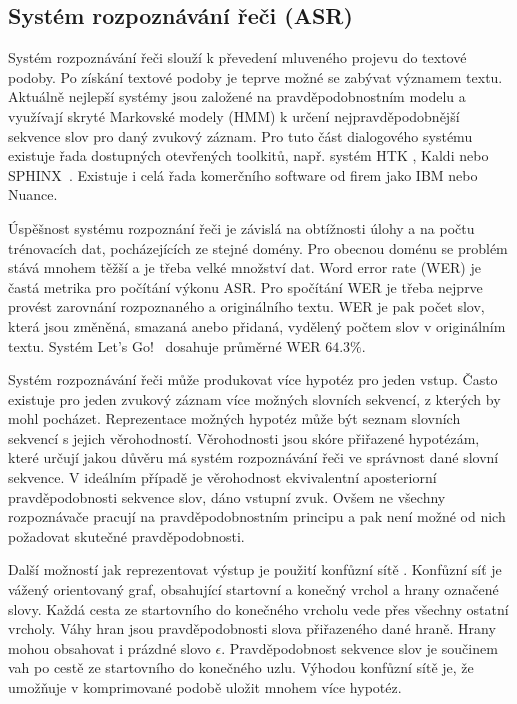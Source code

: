 \subsection{Systém rozpoznávání řeči (ASR)}

Systém rozpoznávání řeči slouží k převedení mluveného projevu do textové podoby. 
Po získání textové podoby je teprve možné se zabývat významem textu.
Aktuálně nejlepší systémy jsou založené na pravděpodobnostním modelu a využívají skryté Markovské modely (HMM) k určení nejpravděpodobnější sekvence slov pro daný zvukový záznam.
Pro tuto část dialogového systému existuje řada dostupných otevřených toolkitů, např. systém HTK \cite{young2002htk}, Kaldi \cite{Povey_ASRU2011} nebo SPHINX~\cite{walker2004sphinx}.
Existuje i celá řada komerčního software od firem jako IBM nebo Nuance.

Úspěšnost systému rozpoznání řeči je závislá na obtížnosti úlohy a na počtu trénovacích dat, pocházejících ze stejné domény.
Pro obecnou doménu se problém stává mnohem těžší a je třeba velké množství dat. 
Word error rate (WER) je častá metrika pro počítání výkonu ASR.
Pro spočítání WER je třeba nejprve provést zarovnání rozpoznaného a originálního textu. WER je pak počet slov, která jsou změněná, smazaná anebo přidaná, vydělený počtem slov v originálním textu.
Systém Let's Go!~\cite{raux2006doing} dosahuje průměrné WER $64.3\%$.

Systém rozpoznávání řeči může produkovat více hypotéz pro jeden vstup.
Často existuje pro jeden zvukový záznam více možných slovních sekvencí, z kterých by mohl pocházet.
Reprezentace možných hypotéz může být seznam slovních sekvencí s jejich věrohodností.
Věrohodnosti jsou skóre přiřazené hypotézám, které určují jakou důvěru má systém rozpoznávání řeči ve správnost dané slovní sekvence.
V ideálním případě je věrohodnost ekvivalentní aposteriorní pravděpodobnosti sekvence slov, dáno vstupní zvuk.
Ovšem ne všechny rozpoznávače pracují na pravděpodobnostním principu a pak není možné od nich požadovat skutečné pravděpodobnosti.

Další možností jak reprezentovat výstup je použití konfůzní sítě \cite{bertoldi2005new}. 
Konfůzní síť je vážený orientovaný graf, obsahující startovní a konečný vrchol a hrany označené slovy. 
Každá cesta ze startovního do konečného vrcholu vede přes všechny ostatní vrcholy. 
Váhy hran jsou pravděpodobnosti slova přiřazeného dané hraně. 
Hrany mohou obsahovat i prázdné slovo $\epsilon$.
Pravděpodobnost sekvence slov je součinem vah po cestě ze startovního do konečného uzlu.
Výhodou konfůzní sítě je, že umožňuje v komprimované podobě uložit mnohem více hypotéz.

